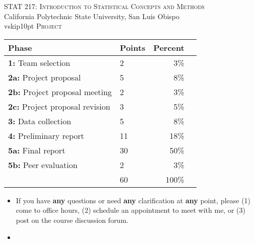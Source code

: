 \documentclass[letterpaper,12pt]{report}
\begin{document}
\begin{center}
\large{\textsc{STAT 217: Introduction to Statistical Concepts and Methods}}\\
California Polytechnic State University, San Luis Obispo
\\vskip10pt
\large{\textsc{Project}}
\end{center}

\vskip10pt
\begin{center}
{\renewcommand{\arraystretch}{1.1}
\begin{tabular}{llrr}
\hline
Phase & Points & Percent \\
\hline\hline
\textbf{1:} Team selection                & 2  & 3\% \\
\textbf{2a:} Project proposal             & 5  & 8\% \\
\textbf{2b:} Project proposal meeting     & 2  & 3\% \\
\textbf{2c:} Project proposal revision    & 3  & 5\% \\
\textbf{3:} Data collection               & 5  & 8\% \\
\textbf{4:} Preliminary report            & 11 & 18\% \\
\textbf{5a:} Final report                 & 30 & 50\% \\
\textbf{5b:} Peer evaluation              & 2  & 3\%  \\
\hline
 &   60 & 100\%
\end{tabular}}
\end{center}


\begin{itemize}
    \item[] If you have \textbf{any} questions or need \textbf{any} clarification at \textbf{any} point, please (1) come to office hours, (2) schedule an appointment to meet with me, or (3) post on the course discussion forum.
    \item[]
\end{itemize}
\end{document}
